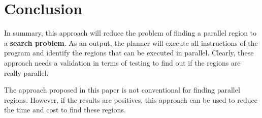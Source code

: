 \documentclass[letterpaper]{article}
\begin{document}
\section{Conclusion}

In summary, this approach will reduce the problem of finding a parallel region to a \textbf{search problem}. As an output, the planner will execute all instructions of the program and identify the regions that can be executed in parallel. Clearly, these approach needs a validation in terms of testing to find out if the regions are really parallel.

The approach proposed in this paper is not conventional for finding parallel regions. However, if the results are positives, this approach can be used to reduce the time and cost to find these regions.



\end{document}
